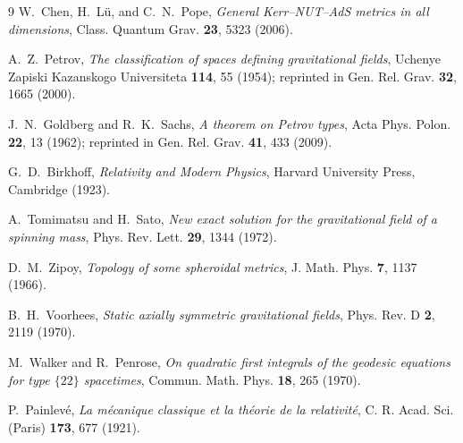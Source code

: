 \documentclass[11pt,a4paper]{article}
\theoremstyle{definition}
\begin{document}
\begin{thebibliography}{9}
W.~Chen, H.~L\"u, and C.~N.~Pope,
\emph{General Kerr--NUT--AdS metrics in all dimensions},
Class. Quantum Grav. \textbf{23}, 5323 (2006).

A.~Z.~Petrov,
\emph{The classification of spaces defining gravitational fields},
Uchenye Zapiski Kazanskogo Universiteta \textbf{114}, 55 (1954); reprinted in Gen. Rel. Grav. \textbf{32}, 1665 (2000).

J.~N.~Goldberg and R.~K.~Sachs,
\emph{A theorem on Petrov types},
Acta Phys. Polon. \textbf{22}, 13 (1962); reprinted in Gen. Rel. Grav. \textbf{41}, 433 (2009).

G.~D.~Birkhoff,
\emph{Relativity and Modern Physics},
Harvard University Press, Cambridge (1923).

A.~Tomimatsu and H.~Sato,
\emph{New exact solution for the gravitational field of a spinning mass},
Phys. Rev. Lett. \textbf{29}, 1344 (1972).

D.~M.~Zipoy,
\emph{Topology of some spheroidal metrics},
J. Math. Phys. \textbf{7}, 1137 (1966).

B.~H.~Voorhees,
\emph{Static axially symmetric gravitational fields},
Phys. Rev. D \textbf{2}, 2119 (1970).

M.~Walker and R.~Penrose,
\emph{On quadratic first integrals of the geodesic equations for type $\{22\}$ spacetimes},
Commun. Math. Phys. \textbf{18}, 265 (1970).

P.~Painlev\'e,
\emph{La m\'ecanique classique et la th\'eorie de la relativit\'e},
C. R. Acad. Sci. (Paris) \textbf{173}, 677 (1921).


\end{thebibliography}
\end{document}
